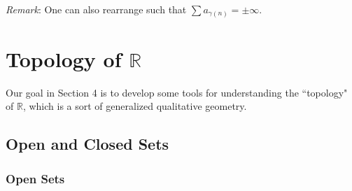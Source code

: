 \documentclass[11pt]{article}
\begin{document}
\emph{Remark}: One can also rearrange such that $\sum a_{\gamma(n)} = \pm \infty$.

\newpage

\section{Topology of $\mathbb{R}$}

Our goal in Section 4 is to develop some tools for understanding the ``topology" of $\mathbb{R}$, which is a sort of generalized qualitative geometry.

\subsection{Open and Closed Sets}

\subsubsection{Open Sets}
\end{document}
